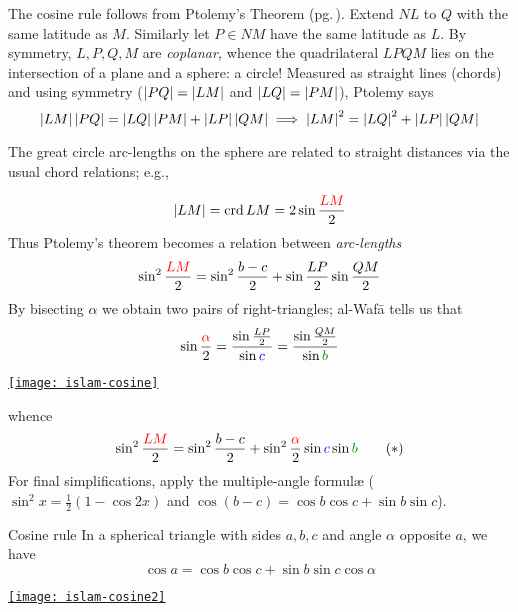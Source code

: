 The cosine rule follows from Ptolemy's Theorem (pg.\,\pageref{pg:ptolemythm}). Extend $NL$ to $Q$ with the same latitude as $M$. Similarly let $P\in NM$ have the same latitude as $L$. By symmetry, $L,P,Q,M$ are \emph{coplanar,} whence the quadrilateral $LPQM$ lies on the intersection of a plane and a sphere: a circle! Measured as straight lines (chords) and using symmetry ($\left| PQ\right|=\left| LM\right|$ and $\left| LQ\right|=\left| PM\right|$), Ptolemy says
\[\left| LM\right|\left| PQ\right|=\left| LQ\right|\left| PM\right|+\left| LP\right|\left| QM\right| \implies \left| LM\right|^2=\left| LQ\right|^2+\left| LP\right|\left| QM\right|\]
\goodbreak

The great circle arc-lengths on the sphere are related to straight distances via the usual chord relations; e.g.,\par
\begin{minipage}[t]{0.65\linewidth}\vspace{-5pt}
\[\left| LM\right|=\operatorname{crd} LM=2\sin\frac{\textcolor{red}{LM}}2\]
Thus Ptolemy's theorem becomes a relation between \emph{arc-lengths}
\[\sin^2\frac{\textcolor{red}{LM}}2=\sin^2\frac{b-c}2+\sin\frac{LP}2\sin\frac{QM}2\]
By bisecting $\alpha$ we obtain two pairs of right-triangles; al-Wafā tells us that
\[\sin\frac{\textcolor{red}{\alpha}}2=\frac{\sin\frac{LP}2}{\sin \textcolor{blue}{c}}=\frac{\sin\frac{QM}2}{\sin \textcolor{Green}{b}}\]
\end{minipage}\hfill\begin{minipage}[t]{0.34\linewidth}\vspace{0pt}
\flushright\href{http://math.uci.edu/~ndonalds/math184/islam-cosine.html}{\texttt{[image: islam-cosine]}}
\end{minipage}\bigbreak

\begin{minipage}[t]{0.7\linewidth}\vspace{0pt}
whence
\[\sin^2\frac{\textcolor{red}{LM}}2=\sin^2\frac{b-c}2+\sin^2\frac{\textcolor{red}{\alpha}}2\sin \textcolor{blue}{c}\sin \textcolor{Green}{b}\tag*{($\ast$)}\]
For final simplifications, apply the multiple-angle formulæ ($\sin^2x=\frac 12(1-\cos 2x)$ and $\cos(b-c)=\cos b\cos c+\sin b\sin c$).

\begin{cor*}{Cosine rule}{}
In a spherical triangle with sides $a,b,c$ and angle $\alpha$ opposite $a$, we have
\[\cos a=\cos b\cos c+\sin b\sin c\cos\alpha\]
\end{cor*}

\end{minipage}\hfill\begin{minipage}[t]{0.29\linewidth}\vspace{-10pt}
\flushright\href{http://math.uci.edu/~ndonalds/math184/islam-cosine2.html}{\texttt{[image: islam-cosine2]}}
\end{minipage}\bigbreak

